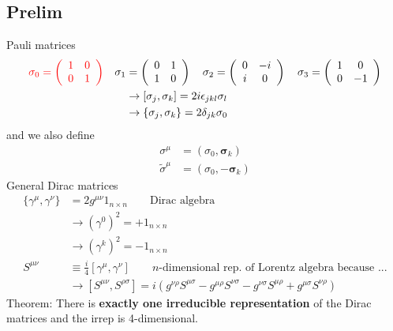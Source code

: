 \documentclass[10pt,a4paper]{report}
\theoremstyle{definition}
\begin{document}
\subsection{Prelim}
Pauli matrices
\begin{align}
\textcolor{red}{\sigma_0=\left(\begin{array}{cc}1&0\\0&1\end{array}\right)}
\quad
\sigma_1&=\left(\begin{array}{cc}0&1\\1&0\end{array}\right)
\quad
\sigma_2=\left(\begin{array}{cc}0&-i\\i&0\end{array}\right)
\quad
\sigma_3=\left(\begin{array}{cc}1&0\\0&-1\end{array}\right)\\
&\rightarrow[\sigma_j,\sigma_k]=2i\epsilon_{jkl}\sigma_l\\
&\rightarrow\{\sigma_j,\sigma_k\}=2\delta_{jk}\sigma_0
\end{align}
and we also define 
\begin{align}
\sigma^\mu&=(\sigma_0,\mathbf{\sigma}_k)\\
\tilde{\sigma}^\mu&=(\sigma_0,-\mathbf{\sigma}_k)
\end{align}
General Dirac matrices
\begin{align}
\{\gamma^\mu,\gamma^\nu\}&=2g^{\mu\nu} 1_{n\times n}\qquad\text{Dirac algebra}\\
&\rightarrow (\gamma^0)^2=+1_{n\times n}\\
&\rightarrow (\gamma^k)^2=-1_{n\times n}\\
S^{\mu\nu}&\equiv\frac{i}{4}[\gamma^\mu,\gamma^\nu]\qquad \text{$n$-dimensional rep. of Lorentz algebra because ...}\\
&\rightarrow [S^{\mu\nu},S^{\rho\sigma}]=i(
g^{\nu\rho}S^{\mu\sigma}
-g^{\mu\rho}S^{\nu\sigma}
-g^{\nu\sigma}S^{\mu\rho}
+g^{\mu\sigma}S^{\nu\rho})
\end{align}
Theorem: There is {\bf exactly one irreducible representation} of the Dirac matrices and the irrep is 4-dimensional.
\end{document}
